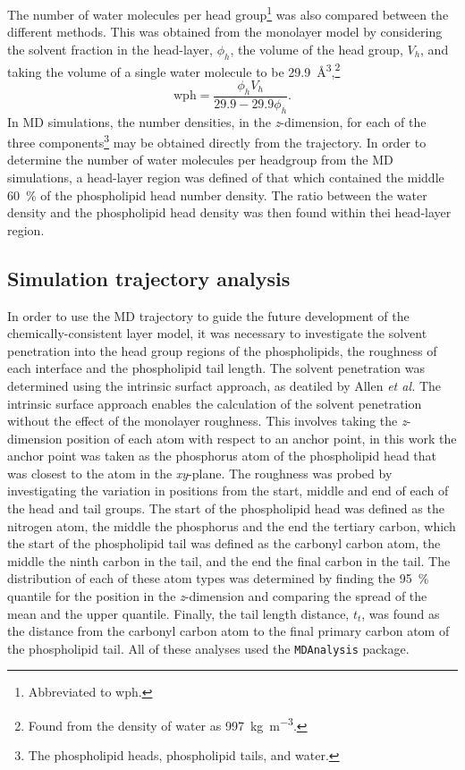 The number of water molecules per head group\footnote{Abbreviated to wph.} was also compared between the different methods.
This was obtained from the monolayer model by considering the solvent fraction in the head-layer, $\phi_h$, the volume of the head group, $V_h$, and taking the volume of a single water molecule to be \SI{29.9}{\angstrom\cubed},\footnote{Found from the density of water as \SI{997}{\kg\per\meter\cubed}.}
%
\begin{equation}
\text{wph}=\frac{\phi_h V_h}{29.9 - 29.9\phi_h}.
\label{equ:wph}
\end{equation}
%
In MD simulations, the number densities, in the \emph{z}-dimension, for each of the three components\footnote{The phospholipid heads, phospholipid tails, and water.} may be obtained directly from the trajectory.
In order to determine the number of water molecules per headgroup from the MD simulations, a head-layer region was defined of that which contained the middle \SI{60}{\percent} of the phospholipid head number density.
The ratio between the water density and the phospholipid head density was then found within thei head-layer region.

\subsection{Simulation trajectory analysis}
\label{sec:traj}
In order to use the MD trajectory to guide the future development of the chemically-consistent layer model, it was necessary to investigate the solvent penetration into the head group regions of the phospholipids, the roughness of each interface and the phospholipid tail length.
The solvent penetration was determined using the intrinsic surfact approach, as deatiled by Allen \emph{et al.}\autocite{allen_specific_2016,pandit_algorithm_2003}
The intrinsic surface approach enables the calculation of the solvent penetration without the effect of the monolayer roughness.
This involves taking the \emph{z}-dimension position of each atom with respect to an anchor point, in this work the anchor point was taken as the phosphorus atom of the phospholipid head that was closest to the atom in the \emph{xy}-plane.
The roughness was probed by investigating the variation in positions from the start, middle and end of each of the head and tail groups.
The start of the phospholipid head was defined as the nitrogen atom, the middle the phosphorus and the end the tertiary carbon, which the start of the phospholipid tail was defined as the carbonyl carbon atom, the middle the ninth carbon in the tail, and the end the final carbon in the tail.
The distribution of each of these atom types was determined by finding the \SI{95}{\percent} quantile for the position in the \emph{z}-dimension and comparing the spread of the mean and the upper quantile.
Finally, the tail length distance, $t_t$, was found as the distance from the carbonyl carbon atom to the final primary carbon atom of the phospholipid tail.
All of these analyses used the \texttt{MDAnalysis} package.\autocite{gowers_mdanalysis_2016,michaud-agrawal_mdanalysis_2011}
